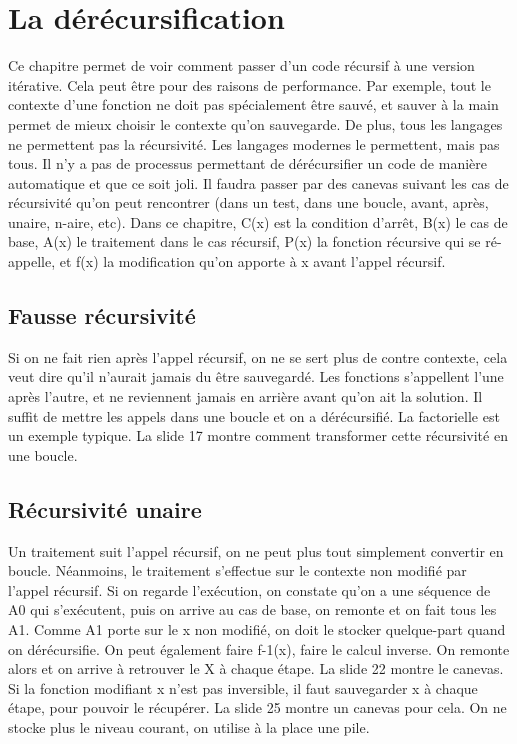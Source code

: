 \documentclass[10pt]{article}
\begin{document}
\section{La dérécursification} 
Ce chapitre permet de voir comment passer d'un code récursif à une version itérative. Cela peut être pour des raisons de performance. Par exemple, tout le contexte d'une fonction ne doit pas spécialement être sauvé, et sauver à la main permet de mieux choisir le contexte qu'on sauvegarde. 
\newline \newline 
De plus, tous les langages ne permettent pas la récursivité. Les langages modernes le permettent, mais pas tous. 
\newline \newline 
Il n'y a pas de processus permettant de dérécursifier un code de manière automatique et que ce soit joli. Il faudra passer par des canevas suivant les cas de récursivité qu'on peut rencontrer (dans un test, dans une boucle, avant, après, unaire, n-aire, etc).  
\newline \newline 
Dans ce chapitre, C(x) est la condition d'arrêt, B(x) le cas de base, A(x) le traitement dans le cas récursif, P(x) la fonction récursive qui se ré-appelle, et f(x) la modification qu'on apporte à x avant l'appel récursif.
\subsection{Fausse récursivité}
Si on ne fait rien après l'appel récursif, on ne se sert plus de contre contexte, cela veut dire qu'il n'aurait jamais du être sauvegardé. Les fonctions s'appellent l'une après l'autre, et ne reviennent jamais en arrière avant qu'on ait la solution. Il suffit de mettre les appels dans une boucle et on a dérécursifié. La factorielle est un exemple typique. 
\newline \newline 
La slide 17 montre comment transformer cette récursivité en une boucle.
\subsection{Récursivité unaire}
Un traitement suit l'appel récursif, on ne peut plus tout simplement convertir en boucle. Néanmoins, le traitement s'effectue sur le contexte non modifié par l'appel récursif.  
\newline \newline 
Si on regarde l'exécution, on constate qu'on a une séquence de A0 qui s'exécutent, puis on arrive au cas de base, on remonte et on fait tous les A1. Comme A1 porte sur le x non modifié, on doit le stocker quelque-part quand on dérécursifie. On peut également faire f-1(x), faire le calcul inverse. On remonte alors et on arrive à retrouver le X à chaque étape. La slide 22 montre le canevas.  
\newline \newline 
Si la fonction modifiant x n'est pas inversible, il faut sauvegarder x à chaque étape, pour pouvoir le récupérer. La slide 25 montre un canevas pour cela. On ne stocke plus le niveau courant, on utilise à la place une pile. 
\end{document}
